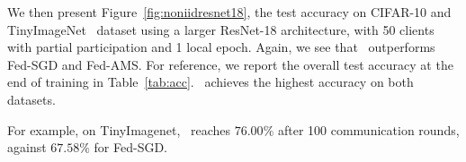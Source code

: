 \documentclass[twoside]{article}
\begin{document}
We then present Figure~\ref{fig:noniidresnet18}, the test accuracy on CIFAR-10 and TinyImageNet~\citep{le2015tiny} dataset using a larger ResNet-18 architecture, with 50 clients with partial participation and 1 local epoch. Again, we see that \algo\ outperforms Fed-SGD and Fed-AMS. For reference, we report the overall test accuracy at the end of training in Table~\ref{tab:acc}. \algo\ achieves the highest accuracy on both datasets.
\begin{table}[H]
\small
\caption{ Test Accuracies for larger models.}\label{tab:acc}
\end{table}

\vspace{-0.2in}
 For example, on TinyImagenet, \algo\ reaches $76.00\%$ after 100 communication rounds, against $67.58\%$ for Fed-SGD.
\vspace{-0.1in}


%
%
%
%
%
%
\end{document}
